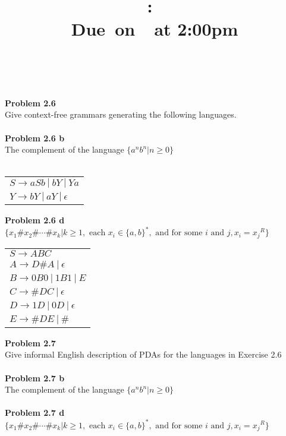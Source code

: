 \documentclass{article}
\title{
    \vspace{2in}
    \textmd{\textbf{\hmwkClass:\ \hmwkTitle}}\\
    \normalsize\vspace{0.1in}\small{Due\ on\ \hmwkDueDate\ at 2:00pm}\\
    \vspace{0.1in}\large{\textit{\hmwkClassInstructor\ \hmwkClassTime}}
    \vspace{3in}
}
\author{\textbf{\hmwkAuthorName}}
\date{}
\newcommand{\problem}[1]{\large{\textbf{Problem #1} \\}}
\begin{document}
\maketitle

\pagebreak

\problem{2.6}
Give context-free grammars generating the following languages. \\  \\
\problem{2.6 b}
The complement of the language $\{a^n b^n | n \geq 0\}$ \\ \\

\begin{table}[h!]
\centering
\begin{tabular}{l}
$S \rightarrow a S b\: | \:b Y \:|\: Y a $\\
$Y \rightarrow b Y \:| \:a Y \:| \:\epsilon$
\end{tabular}
\end{table}

\problem{2.6 d}
$\{x_1 \# x_2 \# \cdots \# x_k |  k \geq 1, \text{ each }x_i \in \{a,b\}^*,\text{ and for some } i \text{ and } j, x_i 
= {x_j}^R\}$

\begin{table}[h!]
\centering
\begin{tabular}{l}
$S \rightarrow A B C $\\
$A \rightarrow D \# A \:| \: \epsilon $\\
$B \rightarrow 0 B 0 \: | \: 1 B 1 \: | \: E $\\
$C \rightarrow \#DC \:| \: \epsilon $\\
$D \rightarrow 1D \:| \: 0D \: | \: \epsilon $\\
$E \rightarrow \#DE \:| \: \# $\\
\end{tabular}
\end{table}



\problem{2.7}
Give informal English description of PDAs for the languages in Exercise 2.6 \\ \\
\problem{2.7 b}
The complement of the language $\{a^n b^n | n \geq 0\}$ \\ \\
\problem{2.7 d}
$\{x_1 \# x_2 \# \cdots \# x_k |  k \geq 1, \text{ each }x_i \in \{a,b\}^*,\text{ and for some } i \text{ and } j, x_i 
= {x_j}^R\}$ \\ \\
\end{document}
